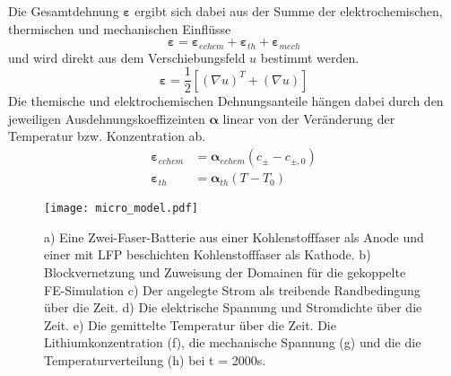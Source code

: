Die Gesamtdehnung $\boldsymbol{\varepsilon}$ ergibt sich dabei aus der Summe der elektrochemischen, thermischen und mechanischen Einflüsse
\begin{equation}\label{eq:strain_total}
    \boldsymbol{\varepsilon} = \boldsymbol{\varepsilon}_{echem} +\boldsymbol{\varepsilon}_{th} + \boldsymbol{\varepsilon}_{mech}
\end{equation}
und wird direkt aus dem Verschiebungsfeld $u$ bestimmt werden.
\begin{equation}\label{eq:strain_total_displacement}
    \boldsymbol{\varepsilon} = \frac{1}{2}\left[\left(\nabla u\right)^T + \left(\nabla u\right)\right]
\end{equation}
Die themische und elektrochemischen Dehnungsanteile hängen dabei durch den jeweiligen Ausdehnungskoeffizeinten $\boldsymbol{\alpha}$ linear von der Veränderung der Temperatur bzw. Konzentration ab.
\begin{align}
    \boldsymbol{\varepsilon}_{echem} &= \boldsymbol{\alpha}_{echem} \left(c_{\pm}-c_{\pm,0}\right)\\
    \boldsymbol{\varepsilon}_{th}  &= \boldsymbol{\alpha}_{th}\left( T - T_0\right)
\end{align}

\begin{figure}[!h]
        \center
		\texttt{[image: micro\_model.pdf]}
		\caption{\label{fig:micro_model}a) Eine Zwei-Faser-Batterie aus einer Kohlenstofffaser als Anode und einer mit LFP beschichten Kohlenstofffaser als Kathode. b) Blockvernetzung und Zuweisung der Domainen für die gekoppelte FE-Simulation c) Der angelegte Strom als treibende Randbedingung über die Zeit. d) Die elektrische Spannung und Stromdichte über die Zeit. e) Die gemittelte Temperatur über die Zeit. Die Lithiumkonzentration (f), die mechanische Spannung (g) und die die Temperaturverteilung (h) bei t = 2000s.}
\end{figure}

